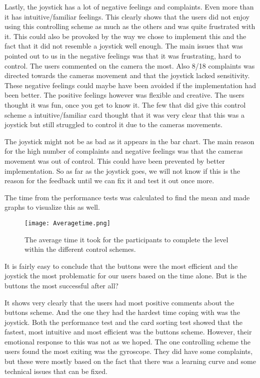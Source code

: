 Lastly, the joystick has a lot of negative feelings and complaints. Even more than it has intuitive/familiar feelings. This clearly shows that the users did not enjoy using this controlling scheme as much as the others and was quite frustrated with it. This could also be provoked by the way we chose to implement this and the fact that it did not resemble a joystick well enough. The main issues that was pointed out to us in the negative feelings was that it was frustrating, hard to control. The users commented on the camera the most. Also 8/18 complaints was directed towards the cameras movement and that the joystick lacked sensitivity. These negative feelings could maybe have been avoided if the implementation had been better. %
The positive feelings however was flexible and creative. The users thought it was fun, once you get to know it. 
The few that did give this control scheme a intuitive/familiar card thought that it was very clear that this was a joystick but still struggled to control it due to the cameras movements.

The joystick might not be as bad as it appears in the bar chart. The main reason for the high number of complaints and negative feelings was that the cameras movement was out of control. This could have been prevented by better implementation. So as far as the joystick goes, we will not know if this is the reason for the feedback until we can fix it and test it out once more.


The time from the performance tests was calculated to find the mean and made graphs to visualize this as well. 

\begin{figure}[H]
\centering
\texttt{[image: Averagetime.png]}
\caption{The average time it took for the participants to complete the level within the different control schemes.}
\end{figure}

It is fairly easy to conclude that the buttons were the most efficient and the joystick the most problematic for our users based on the time alone. But is the buttons the most successful after all?

It shows very clearly that the users had most positive comments about the buttons scheme. And the one they had the hardest time coping with was the joystick. 
Both the performance test and the card sorting test showed that the fastest, most intuitive and most efficient was the buttons scheme. However, their emotional response to this was not as we hoped. 
The one controlling scheme the users found the most exiting was the gyroscope. They did have some complaints, but these were mostly based on the fact that there was a learning curve and some technical issues that can be fixed. 

